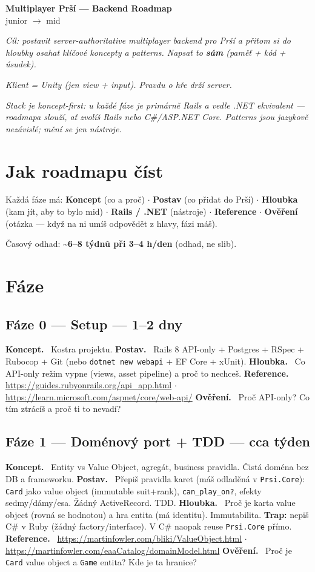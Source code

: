 \documentclass[11pt]{article}
\newcommand{\phase}[2]{\subsection{#1 \textnormal{\textcolor{soft}{\small— #2}}}}
\newcommand{\field}[1]{\textbf{#1.}\ }
\begin{document}
\begin{center}
{\huge\bfseries\color{accent} Multiplayer Prší — Backend Roadmap}\\[4pt]
{\large junior $\rightarrow$ mid}
\end{center}

\vspace{4pt}

\textit{Cíl: postavit server-authoritative multiplayer backend pro Prší a přitom si do
hloubky osahat klíčové koncepty a patterns. Napsat to \textbf{sám} (paměť + kód + úsudek).}

\textit{Klient = Unity (jen view + input). Pravdu o hře drží server.}

\textit{Stack je koncept-first: u každé fáze je primárně Rails a vedle .NET ekvivalent —
roadmapa slouží, ať zvolíš Rails nebo C\#/ASP.NET Core. Patterns jsou jazykově nezávislé;
mění se jen nástroje.}

\section{Jak roadmapu číst}

Každá fáze má: \textbf{Koncept} (co a proč) $\cdot$ \textbf{Postav} (co přidat do Prší) $\cdot$
\textbf{Hloubka} (kam jít, aby to bylo mid) $\cdot$ \textbf{Rails / .NET} (nástroje) $\cdot$
\textbf{Reference} $\cdot$ \textbf{Ověření} (otázka — když na ni umíš odpovědět z hlavy, fázi máš).

Časový odhad: \textbf{\textasciitilde6–8 týdnů při 3–4 h/den} (odhad, ne slib).

\section{Fáze}

\phase{Fáze 0 — Setup}{1–2 dny}
\field{Koncept} Kostra projektu.
\field{Postav} Rails 8 API-only + Postgres + RSpec + Rubocop + Git (nebo \texttt{dotnet new webapi} + EF Core + xUnit).
\field{Hloubka} Co API-only režim vypne (views, asset pipeline) a proč to nechceš.
\field{Reference} \url{https://guides.rubyonrails.org/api_app.html} $\cdot$ \url{https://learn.microsoft.com/aspnet/core/web-api/}
\field{Ověření} Proč API-only? Co tím ztrácíš a proč ti to nevadí?

\phase{Fáze 1 — Doménový port + TDD}{cca týden}
\field{Koncept} Entity vs Value Object, agregát, business pravidla. Čistá doména bez DB a frameworku.
\field{Postav} Přepiš pravidla karet (máš odladěná v \texttt{Prsi.Core}): \texttt{Card} jako value object (immutable suit+rank), \texttt{can\_play\_on?}, efekty sedmy/dámy/esa. Žádný ActiveRecord. TDD.
\field{Hloubka} Proč je karta value object (rovná se hodnotou) a hra entita (má identitu). Immutabilita. \textbf{Trap:} nepiš C\# v Ruby (žádný factory/interface). V C\# naopak reuse \texttt{Prsi.Core} přímo.
\field{Reference} \url{https://martinfowler.com/bliki/ValueObject.html} $\cdot$ \url{https://martinfowler.com/eaaCatalog/domainModel.html}
\field{Ověření} Proč je \texttt{Card} value object a \texttt{Game} entita? Kde je ta hranice?
\end{document}
